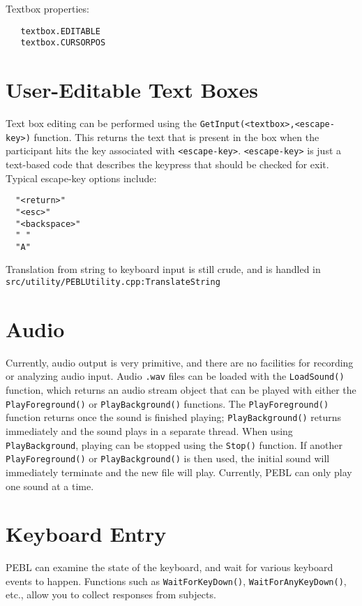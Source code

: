 Textbox properties:
\begin{verbatim}
   textbox.EDITABLE
   textbox.CURSORPOS 
\end{verbatim}
 


\section{User-Editable Text Boxes}

Text box editing can be performed using the \verb+GetInput(<textbox>,<escape-key>)+ function.  This returns the text that is present in the box when the participant hits the key associated with \verb+<escape-key>+.  
\verb+<escape-key>+ is just a text-based code that describes the keypress 
that should be checked for exit. Typical escape-key options include:
\begin{verbatim}
  "<return>"
  "<esc>"
  "<backspace>"
  " "
  "A"
\end{verbatim}
 

Translation from string to keyboard input is still crude, 
and is handled in \texttt{src/utility/PEBLUtility.cpp:TranslateString} 


\section{Audio}

Currently, audio output is very primitive, and there are no facilities for recording or analyzing audio input. Audio \texttt{.wav} files can be loaded with the \texttt{LoadSound()} function, which returns an audio stream object that can be played  with either the \texttt{PlayForeground()} or \texttt{PlayBackground()} functions.  
The \texttt{PlayForeground()} function returns once the sound is finished playing; \texttt{PlayBackground()} returns immediately and the sound plays in a separate thread.  When using \texttt{PlayBackground}, playing can be stopped using the \texttt{Stop()} function.  If another \texttt{PlayForeground()} or \texttt{PlayBackground()} is then used,
the initial sound will immediately terminate and the new file will play. Currently, PEBL can only play one sound at a time.


\section{Keyboard Entry}

PEBL can examine the state of the keyboard, and wait for various keyboard events to happen. Functions such as \texttt{WaitForKeyDown()}, \texttt{WaitForAnyKeyDown()}, etc., allow you to collect responses from subjects.


